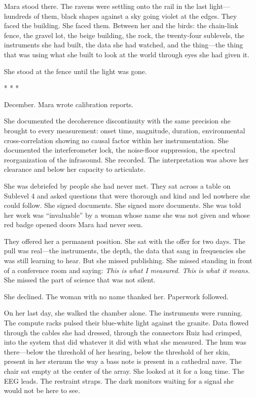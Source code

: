 \documentclass[12pt]{article}
\newcommand{\scenebreak}{\begin{center}* * *\end{center}}
\begin{document}
Mara stood there. The ravens were settling onto the rail in the last light---hundreds of them, black shapes against a sky going violet at the edges. They faced the building. She faced them. Between her and the birds: the chain-link fence, the gravel lot, the beige building, the rock, the twenty-four sublevels, the instruments she had built, the data she had watched, and the thing---the thing that was using what she built to look at the world through eyes she had given it.

She stood at the fence until the light was gone.

\scenebreak

December. Mara wrote calibration reports.

She documented the decoherence discontinuity with the same precision she brought to every measurement: onset time, magnitude, duration, environmental cross-correlation showing no causal factor within her instrumentation. She documented the interferometer lock, the noise-floor suppression, the spectral reorganization of the infrasound. She recorded. The interpretation was above her clearance and below her capacity to articulate.

She was debriefed by people she had never met. They sat across a table on Sublevel 4 and asked questions that were thorough and kind and led nowhere she could follow. She signed documents. She signed more documents. She was told her work was ``invaluable'' by a woman whose name she was not given and whose red badge opened doors Mara had never seen.

They offered her a permanent position. She sat with the offer for two days. The pull was real---the instruments, the depth, the data that sang in frequencies she was still learning to hear. But she missed publishing. She missed standing in front of a conference room and saying: \textit{This is what I measured. This is what it means.} She missed the part of science that was not silent.

She declined. The woman with no name thanked her. Paperwork followed.

On her last day, she walked the chamber alone. The instruments were running. The compute racks pulsed their blue-white light against the granite. Data flowed through the cables she had dressed, through the connectors Ruiz had crimped, into the system that did whatever it did with what she measured. The hum was there---below the threshold of her hearing, below the threshold of her skin, present in her sternum the way a bass note is present in a cathedral nave. The chair sat empty at the center of the array. She looked at it for a long time. The EEG leads. The restraint straps. The dark monitors waiting for a signal she would not be here to see.
\end{document}
